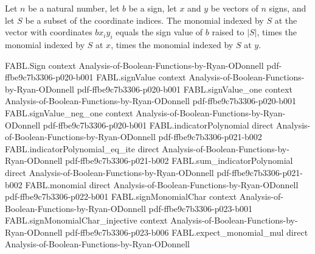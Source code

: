 \begin{theorem}
\label{FABL.monomial_scaledPointwiseProduct}
\leanok
{}
Let $n$ be a natural number, let $b$ be a sign, let $x$ and $y$ be vectors of $n$ signs,
and let $S$ be a subset of the coordinate indices. The monomial indexed by $S$ at the
vector with coordinates $b x_i y_i$ equals the sign value of $b$ raised to $|S|$, times
the monomial indexed by $S$ at $x$, times the monomial indexed by $S$ at $y$.
\end{theorem}

\begin{theorem}
\label{FABL.expect_hastadCore_eq_fourierSum}
\leanok
{}
\proofstep
  {FABL.Sign}
  {context}
  {Analysis-of-Boolean-Functions-by-Ryan-ODonnell}
  {pdf-ffbe9c7b3306-p020-b001}
\proofstep
  {FABL.signValue}
  {context}
  {Analysis-of-Boolean-Functions-by-Ryan-ODonnell}
  {pdf-ffbe9c7b3306-p020-b001}
\proofstep
  {FABL.signValue_one}
  {context}
  {Analysis-of-Boolean-Functions-by-Ryan-ODonnell}
  {pdf-ffbe9c7b3306-p020-b001}
\proofstep
  {FABL.signValue_neg_one}
  {context}
  {Analysis-of-Boolean-Functions-by-Ryan-ODonnell}
  {pdf-ffbe9c7b3306-p020-b001}
\proofstep
  {FABL.indicatorPolynomial}
  {direct}
  {Analysis-of-Boolean-Functions-by-Ryan-ODonnell}
  {pdf-ffbe9c7b3306-p021-b002}
\proofstep
  {FABL.indicatorPolynomial_eq_ite}
  {direct}
  {Analysis-of-Boolean-Functions-by-Ryan-ODonnell}
  {pdf-ffbe9c7b3306-p021-b002}
\proofstep
  {FABL.sum_indicatorPolynomial}
  {direct}
  {Analysis-of-Boolean-Functions-by-Ryan-ODonnell}
  {pdf-ffbe9c7b3306-p021-b002}
\proofstep
  {FABL.monomial}
  {direct}
  {Analysis-of-Boolean-Functions-by-Ryan-ODonnell}
  {pdf-ffbe9c7b3306-p022-b001}
\proofstep
  {FABL.signMonomialChar}
  {context}
  {Analysis-of-Boolean-Functions-by-Ryan-ODonnell}
  {pdf-ffbe9c7b3306-p023-b001}
\proofstep
  {FABL.signMonomialChar_injective}
  {context}
  {Analysis-of-Boolean-Functions-by-Ryan-ODonnell}
  {pdf-ffbe9c7b3306-p023-b006}
\proofstep
  {FABL.expect_monomial_mul}
  {direct}
  {Analysis-of-Boolean-Functions-by-Ryan-ODonnell}

\end{theorem}
